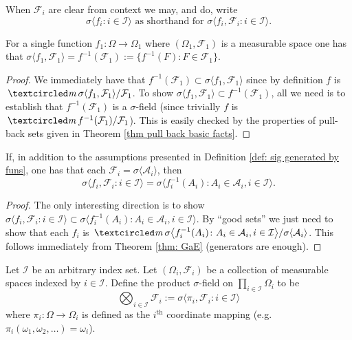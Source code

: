 When $\mathcal F_i$ are clear from context we may, and do, write
\[
\text{
$\sigma\langle f_i\colon i\in\mathcal I \rangle$ as shorthand for $\sigma\langle f_i, \mathcal F_i\colon i\in\mathcal I \rangle$.
}
\]


\begin{theorem}
For a single function $f_1:\Omega \rightarrow \Omega_1$ where $(\Omega_1, \mathcal F_1)$ is a measurable space one has that $\sigma \langle f_1,\mathcal F_1\rangle = f^{-1}(\mathcal F_1):= \{f^{-1}(F)\colon F\in \mathcal F_1 \}$.
\end{theorem}
\begin{proof}
We immediately have that $f^{-1}(\mathcal F_1)\subset \sigma \langle f_1,\mathcal F_1\rangle$ since by definition $f$ is  $\mcirc \sigma \langle f_1,\mathcal F_1\rangle/\mathcal F_1$.
To show $\sigma \langle f_1,\mathcal F_1\rangle\subset f^{-1}(\mathcal F_1)$, all we need is to establish that $f^{-1}(\mathcal F_1)$ is a $\sigma$-field (since trivially $f$ is  $\mcirc f^{-1}(\mathcal F_1)/\mathcal F_1$). This is easily checked by the properties of pull-back sets given in Theorem \ref{thm pull back basic facts}.
\end{proof}


\begin{theorem}
If, in addition to the assumptions presented in Definition \ref{def: sig generated by funs}, one has that each $\mathcal F_i = \sigma\langle \mathcal A_i \rangle$, then
\[\sigma\langle f_i, \mathcal F_i\colon i\in \mathcal I\rangle = \sigma \bigl\langle f_i^{-1}(A_i)\colon A_i\in \mathcal A_i, i\in \mathcal I \bigr\rangle. \]
\end{theorem}
\begin{proof}
The only interesting direction is to show $\sigma\langle f_i, \mathcal F_i\colon i\in \mathcal I\rangle \subset \sigma \bigl\langle f_i^{-1}(A_i)\colon A_i\in \mathcal A_i, i\in \mathcal I \bigr\rangle$. By ``good sets'' we just need to show that each $f_i$ is $\mcirc \sigma \bigl\langle f_i^{-1}(A_i)\colon A_i\in \mathcal A_i, i\in \mathcal I \bigr\rangle / \sigma\langle\mathcal A_i\rangle$. This follows immediately from Theorem \ref{thm: GaE} (generators are enough).
\end{proof}




\begin{definition}
Let $\mathcal I$ be an arbitrary index set. Let $(\Omega_i, \mathcal F_i)$ be a collection of measurable spaces indexed by $i\in \mathcal I$. Define the product $\sigma$-field on $\prod_{i\in \mathcal I}\Omega_i$  to be
\[
\textstyle\bigotimes_{i\in\mathcal I} \mathcal F_i := \sigma\langle \pi_i,\mathcal F_i\colon i\in \mathcal I \rangle
\]
where $\pi_i\colon \Omega \rightarrow \Omega_i$ is defined as the $i^\text{th}$ coordinate mapping (e.g. $\pi_i(\omega_1, \omega_2,\ldots) = \omega_i$).
 \end{definition}


